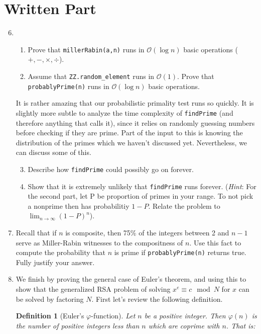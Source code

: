 \documentclass[11pt]{article}
\newtheorem{definition}{Definition}
\newcommand{\cO}{\mathcal{O}}
\begin{document}
\section*{Written Part}
\begin{enumerate}
  \setcounter{enumi}{5}
  \item{
  \begin{enumerate}
    \item{
    Prove that \verb|millerRabin(a,n)| runs in $\cO(\log n)$ basic operations ($+,-,\times,\div$).
    }
    \item{
    Assume that \verb|ZZ.random_element| runs in $\cO(1)$.  Prove that \verb|probablyPrime(n)| runs in $\cO(\log n)$ basic operations.
    }
  \end{enumerate}
  It is rather amazing that our probabilistic primality test runs so quickly.  It is slightly more subtle to analyze the time complexity of \verb|findPrime| (and therefore anything that calls it), since it relies on randomly guessing numbers before checking if they are prime.  Part of the input to this is knowing the distribution of the primes which we haven't discussed yet.  Nevertheless, we can discuss some of this.
  \begin{enumerate}
    \setcounter{enumii}{2}
    \item{
    Describe how \verb|findPrime| could possibly go on forever.
    }
    \item{
    Show that it is extremely unlikely that \verb|findPrime| runs forever.  (\textit{Hint}: For the second part, let P be proportion of primes in your range.  To not pick a nonprime then has probabilitiy $1-P$.  Relate the problem to $\lim_{n\to\infty}(1-P)^n$).
    }
  \end{enumerate}
  }
  \item{
  Recall that if $n$ is composite, then 75\% of the integers between 2 and $n-1$ serve as Miller-Rabin witnesses to the compositness of $n$.  Use this fact to compute the probability that $n$ is prime if \verb|probablyPrime(n)| returns true.  Fully justify your answer.
  }
  \item{
  We finish by proving the general case of Euler's theorem, and using this to show that the generalized RSA problem of solving $x^e\equiv c\mod N$ for $x$ can be solved by factoring $N$.  First let's review the following definition.
  \begin{definition}[Euler's $\varphi$-function]
    Let $n$ be a positive integer.  Then $\varphi(n)$ is the number of positive integers less than $n$ which are coprime with $n$.  That is:

\end{definition}}
\end{enumerate}
\end{document}
